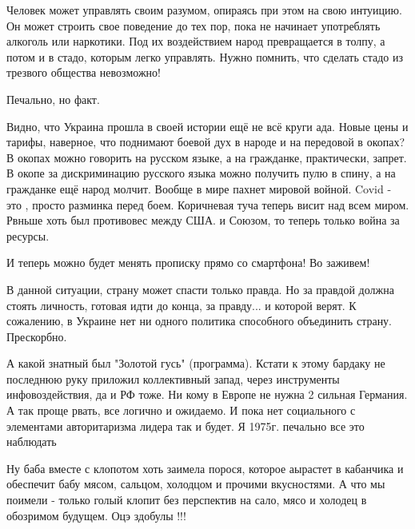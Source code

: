 \begin{itemize}
\begin{multicols}{2}
Человек может управлять своим разумом, опираясь при этом на свою интуицию. Он
может строить свое поведение до тех пор, пока не начинает употреблять алкоголь
или наркотики. Под их воздействием народ превращается в толпу, а потом и в
стадо, которым легко управлять. Нужно помнить, что сделать стадо из трезвого
общества невозможно!

\end{multicols}


Печально, но факт.


Видно, что Украина прошла в своей истории ещё не всё круги ада. Новые цены и
тарифы, наверное, что поднимают боевой дух в народе и на передовой в окопах? В
окопах можно говорить на русском языке, а на гражданке, практически, запрет. В
окопе за дискриминацию русского языка можно получить пулю в спину, а на
гражданке ещё народ молчит. Вообще в мире пахнет мировой войной. Covid - это ,
просто разминка перед боем. Коричневая туча теперь висит над всем миром. Рвньше
хоть был противовес между США. и Союзом, то теперь только война за ресурсы.


И теперь можно будет менять прописку прямо со смартфона! Во заживем!


В данной ситуации, страну может спасти только правда. Но за правдой должна
стоять личность, готовая идти до конца, за правду... и которой верят. К
сожалению, в Украине нет ни одного политика способного объединить страну.
Прескорбно.


А какой знатный был "Золотой гусь" (программа). Кстати к этому бардаку не
последнюю руку приложил коллективный запад, через инструменты инфовоздействия,
да и РФ тоже. Ни кому в Европе не нужна 2 сильная Германия. А так проще рвать,
все логично и ожидаемо. И пока нет социального с элементами авторитаризма
лидера так и будет. Я 1975г. печально все это наблюдать


Ну баба вместе с клопотом хоть заимела порося, которое аырастет в кабанчика и
обеспечит бабу мясом, сальцом, холодцом и прочими вкусностями. А что мы
поимели - только голый клопит без перспектив на сало, мясо и холодец в
обозримом будущем. Оцэ здобулы !!!



\end{itemize}
